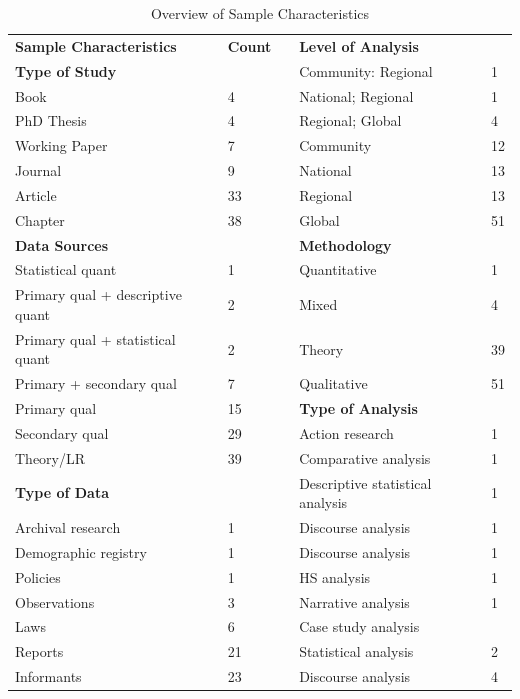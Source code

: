 \documentclass[10pt,a4paper]{article}
\begin{document}
\begin{table}[H]
\centering
\begin{footnotesize}
\caption{Overview of Sample Characteristics}
\label{ATab1}
\begin{tabular}{L{5cm} L{1cm} L{1cm} L{5cm} L{1cm}}
 
\textbf{Sample Characteristics} & \textbf{Count} &  & \textbf{Level of Analysis} & \\  
\textbf{Type of Study} &  &  & Community: Regional & 1 \\ 
Book & 4 & & National; Regional & 1 \\
PhD Thesis & 4 &  & Regional; Global & 4 \\
Working Paper & 7 & & Community & 12 \\
Journal & 9 & & National & 13 \\
Article & 33 &  & Regional & 13 \\
Chapter & 38 &  & Global & 51 \\  
\textbf{Data Sources} &  &  & \textbf{Methodology} &  \\  
Statistical quant & 1 &  & Quantitative & 1 \\
Primary qual + descriptive quant & 2 &  & Mixed & 4 \\
Primary qual + statistical quant & 2 &  & Theory & 39 \\
Primary + secondary qual & 7 & & Qualitative & 51 \\ 
Primary qual & 15 & & \textbf{Type of Analysis} & \\ 
Secondary qual & 29 & & Action research & 1 \\
Theory/LR & 39 &  & Comparative analysis & 1 \\ 
\textbf{Type of Data} &  &  & Descriptive statistical analysis & 1 \\ 
Archival research & 1 & & Discourse analysis & 1 \\
Demographic registry & 1 & & Discourse analysis & 1 \\
Policies & 1 &  & HS analysis & 1 \\
Observations & 3 &  & Narrative analysis & 1 \\
Laws & 6 &  & Case study analysis \\
Reports & 21 &  & Statistical analysis & 2 \\
Informants & 23 &  & Discourse analysis & 4 \\

\end{tabular}
\end{footnotesize}
\end{table}
\end{document}
